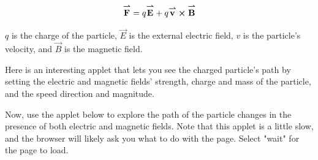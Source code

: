 \documentclass{ximera}
\begin{document}
\begin{equation}
{\overset{\boldsymbol{\rightharpoonup}}{\mathbf{F}}}\hspace{0in}=q{\overset{\boldsymbol{\rightharpoonup}}{\mathbf{E}}}\hspace{0in} + q {\overset{\boldsymbol{\rightharpoonup}}{\mathbf{v}}}\hspace{0in} \boldsymbol\times {\overset{\boldsymbol{\rightharpoonup}}{\mathbf{B}}}\hspace{0in}
\end{equation}

$q$ is the charge of the particle, $\vec{E}$ is the external electric field, $v$ is the particle's velocity, and $\vec{B}$ is the magnetic field.


Here is an interesting applet that lets you see the charged particle's path by setting the electric and magnetic fields' strength, charge and mass of the particle, and the speed direction and magnitude.




\begin{example}
Now, use the applet below to explore the path of the particle changes in the presence of both electric and magnetic fields. Note that this applet is a little slow, and the browser will likely ask you what to do with the page. Select "wait" for the page to load.

\end{example}
\end{document}
